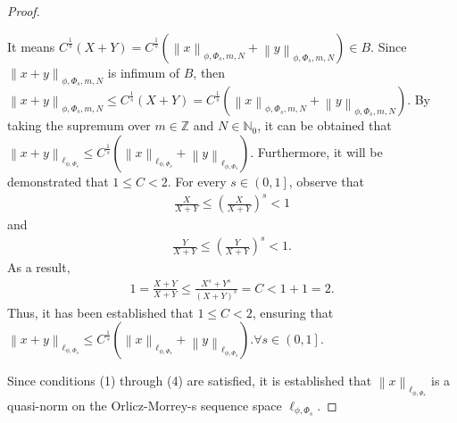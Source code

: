 \documentclass[10pt,a4paper]{amsart}
\begin{document}
\begin{proof}
\begin{enumerate}
        It means $C^{\frac{1}{s}}\left(X+Y\right)=C^{\frac{1}{s}}\left(\left\lVert x \right\rVert _{\phi, \Phi_s, m, N}+\left\lVert y \right\rVert _{\phi, \Phi_s, m, N}\right)\in B$. Since $\left\lVert x+y \right\rVert _{\phi, \Phi_s, m, N}$ is infimum of $B$, then $\left\lVert x+y \right\rVert _{\phi, \Phi_s, m, N}\leq C^{\frac{1}{s}}\left(X+Y\right)=C^{\frac{1}{s}}\left(\left\lVert x \right\rVert _{\phi, \Phi_s, m, N}+\left\lVert y \right\rVert _{\phi, \Phi_s, m, N}\right)$.
        By taking the supremum over $m \in \mathbb{Z}$ and $N \in \mathbb{N}_0$, it can be obtained that $\left\lVert x+y \right\rVert _{\ell_{\phi,\Phi_s}}\leq C^{\frac{1}{s}} \left(\left\lVert x \right\rVert _{\ell_{\phi, \Phi_s}} + \left\lVert y \right\rVert _{\ell_{\phi, \Phi_s}} \right)$.
        Furthermore, it will be demonstrated that $1 \leq C < 2$. For every $s \in \left(0,1\right]$, observe that
        \begin{eqnarray*}
            \frac{X}{X + Y} \leq \left(\frac{X}{X + Y}\right)^s < 1
        \end{eqnarray*}
        and
        \begin{eqnarray*}
            \frac{Y}{X + Y} \leq \left(\frac{Y}{X + Y}\right)^s < 1.
        \end{eqnarray*}
        As a result,
        \begin{eqnarray*}
            1 = \frac{X + Y}{X + Y} \leq \frac{X^s + Y^s}{(X + Y)^s} = C < 1 + 1 = 2.
        \end{eqnarray*}
        Thus, it has been established that \(1 \leq C < 2\), ensuring that $\left\lVert x+y \right\rVert _{\ell_{\phi,\Phi_s}}\leq C^{\frac{1}{s}} \left(\left\lVert x \right\rVert _{\ell_{\phi, \Phi_s}} + \left\lVert y \right\rVert _{\ell_{\phi, \Phi_s}} \right). \forall s\in \left(0,1\right]$.  
    \end{enumerate} 
    Since conditions (1) through (4) are satisfied, it is established that $\left\lVert x \right\rVert _{\ell_{\phi, \Phi_s}}$ is a quasi-norm on the Orlicz-Morrey-s sequence space $\ell_{\phi, \Phi_s}$.
\end{proof}
\end{document}
